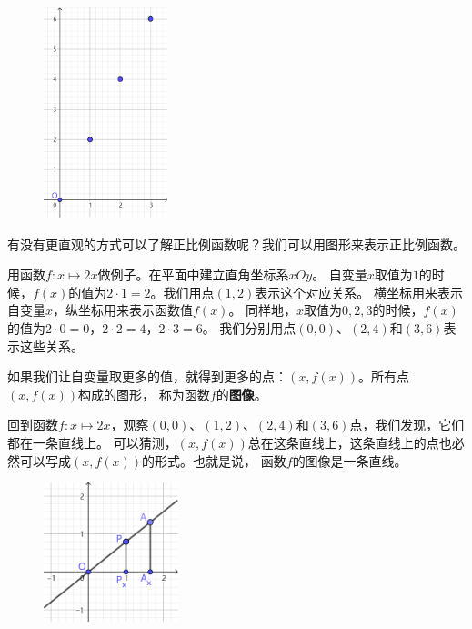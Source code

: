 \documentclass[12pt,UTF8]{ctexbook}
\begin{document}
\begin{figure} %
    \vspace{-10pt}
    \flushright
    \includegraphics[width=0.32\textwidth]{tu/正比例0.png}
\end{figure}

有没有更直观的方式可以了解正比例函数呢？我们可以用图形来表示正比例函数。

用函数$f: x \mapsto 2x$做例子。在平面中建立直角坐标系$xOy$。
自变量$x$取值为$1$的时候，$f(x)$的值为$2\cdot 1 = 2$。我们用点$(1, 2)$表示这个对应关系。
横坐标用来表示自变量$x$，纵坐标用来表示函数值$f(x)$。
同样地，$x$取值为$0,2,3$的时候，$f(x)$的值为$2\cdot 0 = 0$，$2\cdot 2 = 4$，$2\cdot 3 = 6$。
我们分别用点$(0,0)$、$(2,4)$和$(3,6)$表示这些关系。

如果我们让自变量取更多的值，就得到更多的点：$(x, f(x))$。所有点$(x, f(x))$构成的图形，
称为函数$f$的\textbf{图像}。

回到函数$f: x \mapsto 2x$，观察$(0, 0)$、$(1, 2)$、$(2,4)$和$(3,6)$点，我们发现，它们都在一条直线上。
可以猜测，$(x, f(x))$总在这条直线上，这条直线上的点也必然可以写成$(x, f(x))$的形式。也就是说，
函数$f$的图像是一条直线。

\begin{figure} %
    \vspace{-10pt}
    \flushright
    \includegraphics[width=0.35\textwidth]{tu/正比例1.png}
\end{figure}
\end{document}
